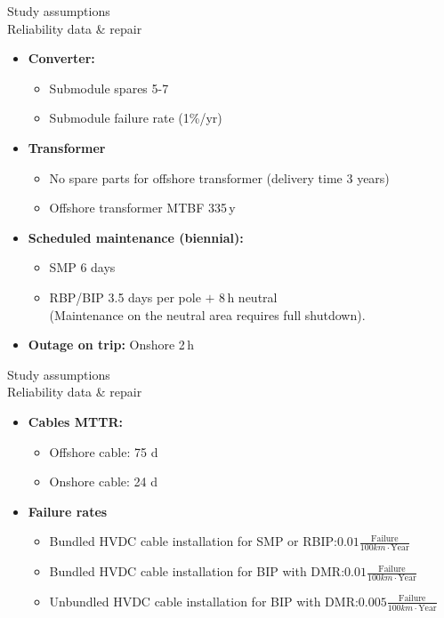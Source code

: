 \begin{frame}{Study assumptions\\Reliability data \& repair}
  \begin{itemize}
    \setlength{\itemsep}{0.35em}
    \item \textbf{Converter:}
      \begin{itemize}
            \item Submodule spares 5-7
            \item Submodule failure rate (1\%/yr)
      \end{itemize}
      \item \textbf{Transformer}
      \begin{itemize}
            \item No spare parts for offshore transformer (delivery time 3 years)
            \item Offshore transformer MTBF 335\,y
      \end{itemize}
    \item \textbf{Scheduled maintenance (biennial):}
    \begin{itemize}
      \item SMP 6 days
      \item RBP/BIP 3.5 days per pole $+$ 8\,h neutral\\(Maintenance on the neutral area requires full shutdown).
    \end{itemize}
      
    \item \textbf{Outage on trip:} Onshore 2\,h
  \end{itemize}
\end{frame}

\begin{frame}{Study assumptions\\Reliability data \& repair}
  \begin{itemize}
    \setlength{\itemsep}{0.35em}
    \item \textbf{Cables MTTR:}
      \begin{itemize}
            \item Offshore cable: 75 d
            \item Onshore cable: 24 d
      \end{itemize}
      \item \textbf{Failure rates}
      \begin{itemize}
            \setlength{\itemsep}{1em}
            \item Bundled HVDC cable installation for SMP or RBIP:\qquad$0.01 \frac{\text{Failure}}{100km\cdot\text{Year}}$
            \item Bundled HVDC cable installation for BIP with DMR:\qquad$0.01 \frac{\text{Failure}}{100km\cdot\text{Year}}$
            \item Unbundled HVDC cable installation for BIP with DMR:\quad$0.005 \frac{\text{Failure}}{100km\cdot\text{Year}}$
      \end{itemize}
  \end{itemize}
\end{frame}

